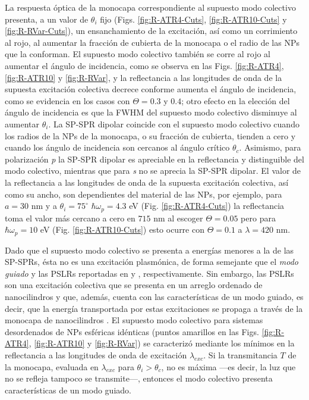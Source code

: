 La respuesta óptica de la monocapa correspondiente al supuesto modo colectivo presenta, a un valor de $\theta_i$ fijo (Figs. \ref{fig:R-ATR4-Cuts}, \ref{fig:R-ATR10-Cuts} y \ref{fig:R-RVar-Cuts}), un ensanchamiento de la excitación, así como un corrimiento al rojo, al aumentar la fracción de cubierta de la monocapa o el radio de las NPs que la conforman. El supuesto modo colectivo también se corre al rojo al aumentar el ángulo de incidencia, como se observa en las Figs. \ref{fig:R-ATR4}, \ref{fig:R-ATR10} y \ref{fig:R-RVar}, y la reflectancia a las longitudes de onda de la supuesta excitación colectiva decrece conforme aumenta el ángulo de incidencia, como se evidencia en los casos con $\Theta=0.3$ y $0.4$; otro efecto en la elección del ángulo de incidencia es que la FWHM del supuesto modo colectivo disminuye al aumentar $\theta_i$. La SP-SPR dipolar coincide con el supuesto modo colectivo cuando los radios de la NPs de la monocapa, o su fracción de cubierta, tienden a cero y cuando los ángulo de incidencia son cercanos al ángulo crítico $\theta_c$. Asimismo, para polarización \emph{p} la SP-SPR dipolar es apreciable en la reflectancia y distinguible del modo colectivo, mientras que para \emph{s} no se aprecia la SP-SPR dipolar. El valor de la reflectancia a las longitudes de onda de la supuesta excitación colectiva, así como su ancho, son dependientes del material de las NPs, por ejemplo, para  $a=30$ nm y a $\theta_i=75^\circ$ $\hbar\omega_p=4.3$ eV (Fig. \ref{fig:R-ATR4-Cuts}) la reflectancia toma el valor más cercano a cero en $715$ nm al escoger  $\Theta=0.05$ pero para $\hbar\omega_p=10$ eV (Fig. \ref{fig:R-ATR10-Cuts}) esto ocurre con $\Theta=0.1$ a $\lambda=420$ nm. 

 Dado que el supuesto modo colectivo se presenta a energías menores a la de las SP-SPRs, ésta no es una excitación plasmónica, de forma semejante que el \emph{modo guiado} y las PSLRs reportadas en  \cite{kabashin2009plasmonic} y \cite{danilov2018ultra}, respectivamente. Sin embargo, las PSLRs son una excitación colectiva que se presenta en un arreglo ordenado de nanocilindros \cite{kabashin2009plasmonic} y \cite{danilov2018ultra} que, además, cuenta con las características de un modo guiado, es decir, que la energía transportada por estas excitaciones se propaga a través de la monocapa de nanocilindros \cite{kabashin2009plasmonic}. El supuesto modo colectivo  para sistemas desordenados de NPs esféricas idénticas (puntos amarillos en las Figs. \ref{fig:R-ATR4}, \ref{fig:R-ATR10} y \ref{fig:R-RVar}) se caracterizó mediante los mínimos en la reflectancia a las  longitudes de onda de excitación $\lambda_{exc}$. Si la transmitancia $T$ de la monocapa, evaluada en $\lambda_{exc}$ para $\theta_i>\theta_c$, no es máxima ---es decir, la luz que no se refleja tampoco se transmite---, entonces el modo colectivo presenta características de un modo guiado.

